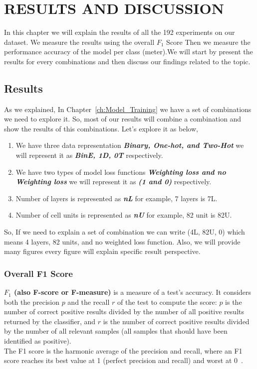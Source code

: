 \chapter{\uppercase{Results And Discussion}}\label{ch:Results}

In this chapter we will explain the results of all the 192 experiments on our dataset. We measure the results using the overall $F_1$ Score Then we measure the performance accuracy of the model per class (meter).We will start by present the results for every combinations and then discuss our findings related to the topic.

\section{Results}

As we explained, In Chapter~\ref{ch:Model_Training} we have a set of combinations we need to explore it. So, most of our results will combine a combination and show the results of this combinations. Let's explore it as below,
\begin{enumerate}
\item  We have three data representation \textbf{\textit{Binary, One-hot, and Two-Hot}} we will represent it as \textbf{\textit{BinE, 1D, 0T}} respectively.
\item We have two types of model loss functions \textbf{\textit{Weighting loss and no Weighting loss}} we will represent it as \textbf{\textit{(1 and 0)}} respectively.
\item Number of layers is represented as \textbf{\textit{nL}} for example, 7 layers is 7L.
  \item Number of cell units is represented as \textbf{\textit{nU}} for example, 82 unit is 82U.
  \end{enumerate}

  So, If we need to explain a set of combination we can write (4L, 82U, 0) which means 4 layers, 82 units, and no weighted loss function. Also, we will provide many figures every figure will explain specific result perspective.
  
\subsection{Overall F1 Score}

\textbf{$F_1$ (also F-score or F-measure)} is a measure of a test's accuracy. It considers both the precision $p$ and the recall $r$ of the test to compute the score: $p$ is the number of correct positive results divided by the number of all positive results returned by the classifier, and $r$ is the number of correct positive results divided by the number of all relevant samples (all samples that should have been identified as positive).\\ The F1 score is the harmonic average of the precision and recall, where an F1 score reaches its best value at 1 (perfect precision and recall) and worst at 0~\cite{Wiki_f1_score}.


